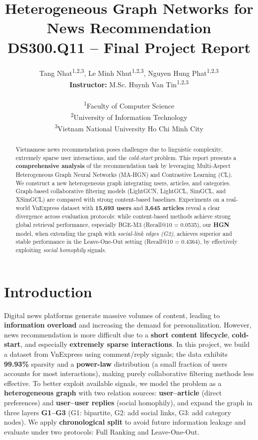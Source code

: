 \documentclass[11pt]{article}
\title{\textbf{Heterogeneous Graph Networks for News Recommendation}\\
\large DS300.Q11 -- Final Project Report}
\author{
    Tang Nhat\textsuperscript{1,2,3}, Le Minh Nhut\textsuperscript{1,2,3}, Nguyen Hung Phat\textsuperscript{1,2,3}\\
    \textbf{Instructor:} M.Sc. Huynh Van Tin\textsuperscript{1,2,3}\\
    \\
    \textsuperscript{1}Faculty of Computer Science\\
    \textsuperscript{2}University of Information Technology\\
    \textsuperscript{3}Vietnam National University Ho Chi Minh City
}
\date{} %
\newcommand{\tightv}{\vspace{-0.1cm}}
\begin{document}
\maketitle
\pagestyle{plain}

\tightv
\begin{abstract}
    \noindent
    Vietnamese news recommendation poses challenges due to linguistic complexity, extremely sparse user interactions, and the \textit{cold-start} problem. This report presents a \textbf{comprehensive analysis} of the recommendation task by leveraging Multi-Aspect Heterogeneous Graph Neural Networks (MA-HGN) and Contrastive Learning (CL). We construct a new heterogeneous graph integrating users, articles, and categories. Graph-based collaborative filtering models (LightGCN, LightGCL, SimGCL, and XSimGCL) are compared with strong content-based baselines. Experiments on a real-world VnExpress dataset with \textbf{15,693 users} and \textbf{3,645 articles} reveal a clear divergence across evaluation protocols: while content-based methods achieve strong global retrieval performance, especially BGE-M3 (Recall@10 = 0.0535), our \textbf{HGN} model, when extending the graph with \textit{social-link edges (G2)}, achieves superior and stable performance in the Leave-One-Out setting (Recall@10 = 0.4364), by effectively exploiting \textit{social homophily} signals.
\end{abstract}

\section{Introduction}
\label{sec:intro}

Digital news platforms generate massive volumes of content, leading to \textbf{information overload} and increasing the demand for personalization.
However, news recommendation is more difficult due to a \textbf{short content lifecycle}, \textbf{cold-start}, and especially \textbf{extremely sparse interactions}.
In this project, we build a dataset from VnExpress using comment/reply signals; the data exhibits \textbf{99.93\%} sparsity and a \textbf{power-law} distribution (a small fraction of users accounts for most interactions), making purely collaborative filtering methods less effective.
To better exploit available signals, we model the problem as a \textbf{heterogeneous graph} with two relation sources: \textbf{user--article} (direct preferences) and \textbf{user--user replies} (social homophily), and expand the graph in three layers \textbf{G1--G3} (G1: bipartite, G2: add social links, G3: add category nodes).
We apply \textbf{chronological split} to avoid future information leakage and evaluate under two protocols: Full Ranking and Leave-One-Out.
\end{document}
